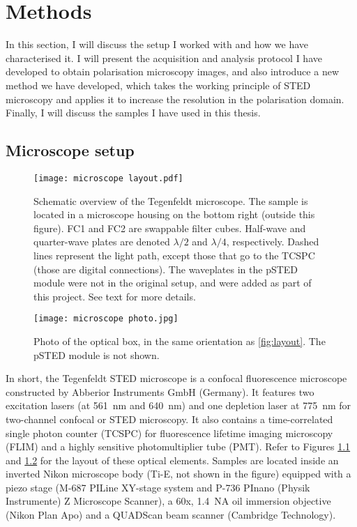 \chapter{Methods}

In this section, I will discuss the setup I worked with and how we have characterised it. I will present the acquisition and analysis protocol I have developed to obtain polarisation microscopy images, and also introduce a new method we have developed, which takes the working principle of STED microscopy and applies it to increase the resolution in the polarisation domain. Finally, I will discuss the samples I have used in this thesis.

\section{Microscope setup}

\begin{figure}[h!]
	\centering
	\texttt{[image: microscope layout.pdf]}
	\caption{
		Schematic overview of the Tegenfeldt microscope. The sample is located in a microscope housing on the bottom right (outside this figure). FC1 and FC2 are swappable filter cubes. Half-wave and quarter-wave plates are denoted $ \lambda/2 $ and $ \lambda/4 $, respectively. Dashed lines represent the light path, except those that go to the TCSPC (those are digital connections). The waveplates in the pSTED module were not in the original setup, and were added as part of this project. See text for more details.
	}
	\label{fig:layout}
\end{figure}

\begin{figure}
	\centering
	\texttt{[image: microscope photo.jpg]}
	\caption{
		Photo of the optical box, in the same orientation as \autoref{fig:layout}. The pSTED module is not shown.
	}
	\label{fig:microscope photo}
\end{figure}

In short, the Tegenfeldt STED microscope is a confocal fluorescence microscope constructed by Abberior Instruments GmbH (Germany). It features two excitation lasers (at 561~nm and 640~nm) and one depletion laser at 775~nm for two-channel confocal or STED microscopy. It also contains a time-correlated single photon counter (TCSPC) for fluorescence lifetime imaging microscopy (FLIM) and a highly sensitive photomultiplier tube (PMT). Refer to Figures \ref{fig:layout} and \ref{fig:microscope photo} for the layout of these optical elements. Samples are located inside an inverted Nikon microscope body (Ti-E, not shown in the figure) equipped with a piezo stage (M-687 PILine XY-stage system and P-736 PInano (Physik Instrumente) Z Microscope Scanner), a 60x, 1.4~NA oil immersion objective (Nikon Plan Apo) and a QUADScan beam scanner (Cambridge Technology).

